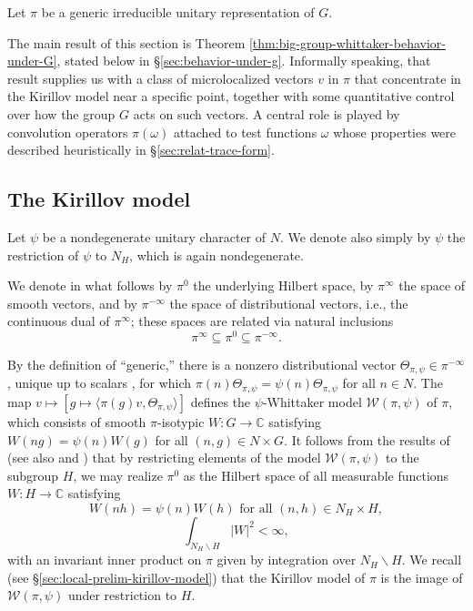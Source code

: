 
Let $\pi$ be a generic irreducible unitary representation of $G$.

The main result of this section is Theorem \ref{thm:big-group-whittaker-behavior-under-G}, stated below in \S\ref{sec:behavior-under-g}.  Informally speaking,
that result supplies us with a class of microlocalized vectors $v$ in $\pi$ that concentrate in the Kirillov model near a specific
point, together with some quantitative control over how the group $G$ acts on such vectors.  A central role is played by convolution operators $\pi(\omega)$ attached to test functions $\omega$ whose properties were described heuristically in \S\ref{sec:relat-trace-form}.


\subsection{The Kirillov model}\label{sec:kirillov-model}
Let $\psi$ be a nondegenerate unitary character of $N$.  We denote also simply by $\psi$ the restriction of $\psi$ to $N_H$, which is again nondegenerate.

We denote in what follows by $\pi^0$ the underlying Hilbert space, by $\pi^\infty$ the space of smooth vectors, and by $\pi^{-\infty}$ the space of distributional vectors, i.e., the continuous dual of $\pi^\infty$; these spaces are related via  natural inclusions
\begin{equation*}
  \pi^\infty \subseteq \pi^0 \subseteq \pi^{-\infty}.
\end{equation*}


By the definition of ``generic,'' there is a nonzero distributional vector  $\Theta_{\pi,\psi} \in \pi^{-\infty}$, unique up to scalars \cite{MR348047}, for which $\pi(n) \Theta_{\pi,\psi} = \psi(n) \Theta_{\pi,\psi}$ for all $n \in N$.  The map $v \mapsto [g \mapsto \langle \pi(g) v, \Theta_{\pi,\psi} \rangle]$ defines the $\psi$-Whittaker model $\mathcal{W}(\pi,\psi)$ of $\pi$, which consists of smooth $\pi$-isotypic $W : G \rightarrow \mathbb{C}$ satisfying $W(n g) = \psi(n) W(g)$ for all $(n,g) \in N \times G$.  It follows from the results of \cite{MR1999922} (see also \cite{MR748505} and \cite[Ch. III]{MR0579172}) that by restricting elements of the model $\mathcal{W}(\pi,\psi)$ to the subgroup $H$, we may realize $\pi^0$ as the Hilbert space of all measurable functions $W : H \rightarrow \mathbb{C}$ satisfying
\begin{equation}\label{eqn:kirillov-model-defn}
  W(n h) = \psi(n) W(h)
  \text{ for all } (n,h) \in N_H \times H,
\end{equation}
\begin{equation}\label{eq:int_n_h-backslash-h}
  \int_{N_H \backslash H} |W|^2 < \infty,
\end{equation}
with an invariant inner product on $\pi$ given by integration over $N_H \backslash H$.  We recall (see \S\ref{sec:local-prelim-kirillov-model}) that the Kirillov model of $\pi$ is the image of $\mathcal{W}(\pi, \psi)$ under restriction to $H$.

